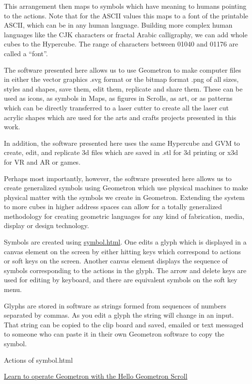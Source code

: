 This arrangement then maps to symbols which have meaning to humans
pointing to the actions. Note that for the ASCII values this maps to a
font of the printable ASCII, which can be in any human language.
Building more complex human languages like the CJK characters or fractal
Arabic calligraphy, we can add whole cubes to the Hypercube. The range
of characters between 01040 and 01176 are called a ``font''.

The software presented here allows us to use Geometron to make computer
files in either the vector graphics .svg format or the bitmap format
.png of all sizes, styles and shapes, save them, edit them, replicate
and share them. These can be used as icons, as symbols in Maps, as
figures in Scrolls, as art, or as patterns which can be directly
transferred to a laser cutter to create all the laser cut acrylic shapes
which are used for the arts and crafts projects presented in this work.

In addition, the software presented here uses the same Hypercube and GVM
to create, edit, and replicate 3d files which are saved in .stl for 3d
printing or x3d for VR and AR or games.

Perhaps most importantly, however, the software presented here allows us
to create generalized symbols using Geometron which use physical
machines to make physical matter with the symbols we create in
Geometron. Extending the system to more cubes in higher address spaces
can allow for a totally generalized methodology for creating geometric
languages for any kind of fabrication, media, display or design
technology.

Symbols are created using \url{symbol.html}. One edits a glyph which is
displayed in a canvas element on the screen by either hitting keys which
correspond to actions or soft keys on the screen. Another canvas element
displays the sequence of symbols corresponding to the actions in the
glyph. The arrow and delete keys are used for editing by keyboard, and
there are equivalent symbols on the soft key menu.


Glyphs are stored in software as strings formed from sequences of
numbers separated by commas. As you edit a glyph the string will change
in an input. That string can be copied to the clip board and saved,
emailed or text messaged to someone who can paste it in their own
Geometron software to copy the symbol.

Actions of symbol.html


\href{scrolls/hellogeometron}{Learn to operate Geometron with the Hello
Geometron Scroll}

